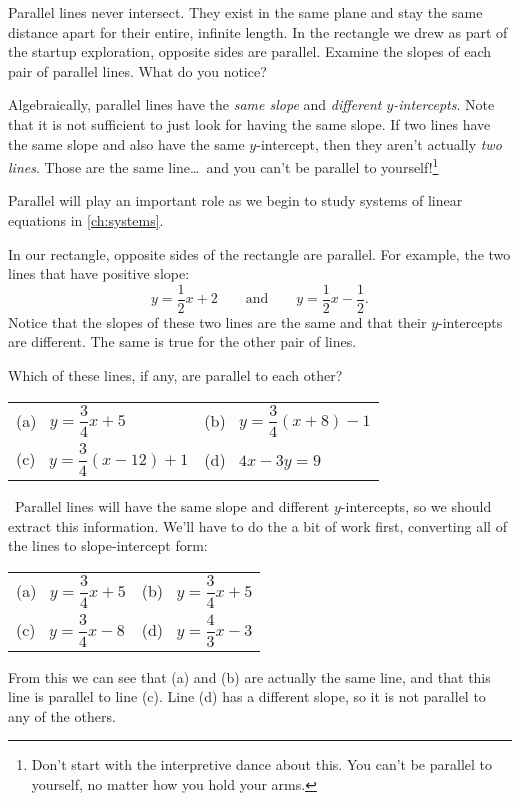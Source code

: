 Parallel lines never intersect. They exist in the same plane and stay the same distance apart for their entire, infinite length. In the rectangle we drew as part of the startup exploration, opposite sides are parallel. Examine the slopes of each pair of parallel lines. What do you notice?

Algebraically, parallel lines have the \textit{same slope} and \textit{different $y$-intercepts}. Note that it is not sufficient to just look for having the same slope. If two lines have the same slope and also have the same $y$-intercept, then they aren't actually \textit{two lines}. Those are the same line\ldots\ and you can't be parallel to yourself!\footnote{Don't start with the interpretive dance about this. You can't be parallel to yourself, no matter how you hold your arms.}

Parallel will play an important role as we begin to study systems of linear equations in \cref{ch:systems}.

In our rectangle, opposite sides of the rectangle are parallel. For example, the two lines that have positive slope: \[y=\frac{1}{2}x+2 \qquad\text{and}\qquad y=\frac{1}{2}x-\frac{1}{2}.\] Notice that the slopes of these two lines are the same and that their $y$-intercepts are different. The same is true for the other pair of lines.

\begin{boxex}
Which of these lines, if any, are parallel to each other?

\begin{center}
\begin{tabularx}{0.8\linewidth}{XX}
(a)~ $y=\dfrac{3}{4}x+5$
&
(b)~ $y=\dfrac{3}{4}(x+8)-1$
\\[3ex]
(c)~ $y=\dfrac{3}{4}(x-12)+1$
&
(d)~ $4x-3y=9$
\end{tabularx}
\end{center}

\exsoln\ Parallel lines will have the same slope and different $y$-intercepts, so we should extract this information. We'll have to do the a bit of work first, converting all of the lines to slope-intercept form:
\begin{center}
\begin{tabularx}{0.8\linewidth}{XX}
(a)~ $y=\dfrac{3}{4}x+5$
&
(b)~ $y=\dfrac{3}{4}x+5$
\\[3ex]
(c)~ $y=\dfrac{3}{4}x-8$
&
(d)~ $y=\dfrac{4}{3}x-3$
\end{tabularx}
\end{center}
From this we can see that (a) and (b) are actually the same line, and that this line is parallel to line (c). Line (d) has a different slope, so it is not parallel to any of the others.
\end{boxex}

